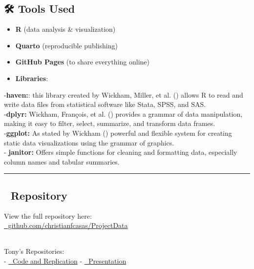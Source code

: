 \documentclass[
  man,
  longtable,
  nolmodern,
  notxfonts,
  notimes,
  colorlinks=true,linkcolor=blue,citecolor=blue,urlcolor=blue]{apa7}
\begin{document}
\subsection{🛠️ Tools Used}\label{tools-used}

\begin{itemize}
\item
  \textbf{R} (data analysis \& visualization)\\
\item
  \textbf{Quarto} (reproducible publishing)\\
\item
  \textbf{GitHub Pages} (to share everything online)
\item
  \textbf{Libraries}:~
\end{itemize}

-\textbf{haven:}: this library created by Wickham, Miller, et al.
() allows R to read and write data files from
statistical software like Stata, SPSS, and SAS.\\

-\textbf{dplyr:} Wickham, François, et al. ()
provides a grammar of data manipulation, making it easy to filter,
select, summarize, and transform data frames.\\

-\textbf{ggplot:} As stated by Wickham ()
powerful and flexible system for creating static data visualizations
using the grammar of graphics.\\

- \textbf{janitor:} Offers simple functions for cleaning and formatting
data, especially column names and tabular summaries.

\begin{center}\rule{0.5\linewidth}{0.5pt}\end{center}

\subsection{📁 Repository}\label{repository}

View the full repository here:\\
\href{https://github.com/christianfcasas/ProjectData}{🔗
github.com/christianfcasas/ProjectData}\\
\strut \\
Tony's Repositories:\\
- \href{https://github.com/Nanaosei95/Replica.git}{🔗 Code and
Replication} -
\href{https://github.com/Nanaosei95/replicapresentation.git}{🔗
Presentation}
\end{document}
